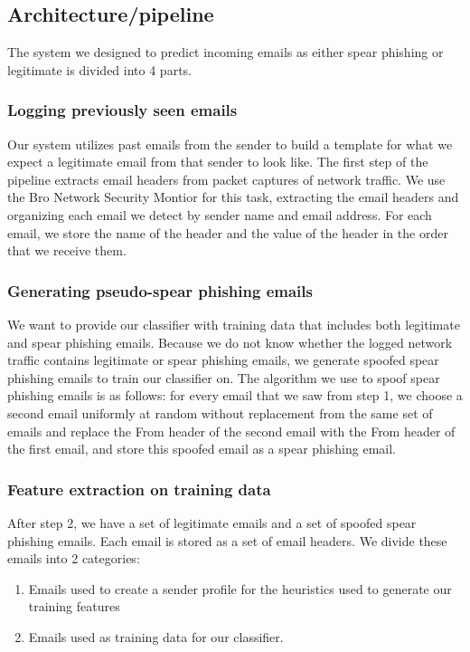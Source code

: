 \subsection{Architecture/pipeline}
The system we designed to predict incoming emails as either spear phishing or legitimate is divided into 4 parts.

\subsubsection{Logging previously seen emails}
Our system utilizes past emails from the sender to build a template for what we expect a legitimate email from that sender to look like. The first step of the pipeline extracts email headers from packet captures of network traffic. We use the Bro Network Security Montior for this task, extracting the email headers and organizing each email we detect by sender name and email address. For each email, we store the name of the header and the value of the header in the order that we receive them.

\subsubsection{Generating pseudo-spear phishing emails}
We want to provide our classifier with training data that includes both legitimate and spear phishing emails. Because we do not know whether the logged network traffic contains legitimate or spear phishing emails, we generate spoofed spear phishing emails to train our classifier on. The algorithm we use to spoof spear phishing emails is as follows: for every email that we saw from step 1, we choose a second email uniformly at random without replacement from the same set of emails and replace the From header of the second email with the From header of the first email, and store this spoofed email as a spear phishing email.

\subsubsection{Feature extraction on training data}
After step 2, we have a set of legitimate emails and a set of spoofed spear phishing emails. Each email is stored as a set of email headers. We divide these emails into 2 categories: 
\begin{enumerate}
\item Emails used to create a sender profile for the heuristics used to generate our training features
\item Emails used as training data for our classifier.
\end{enumerate} 

